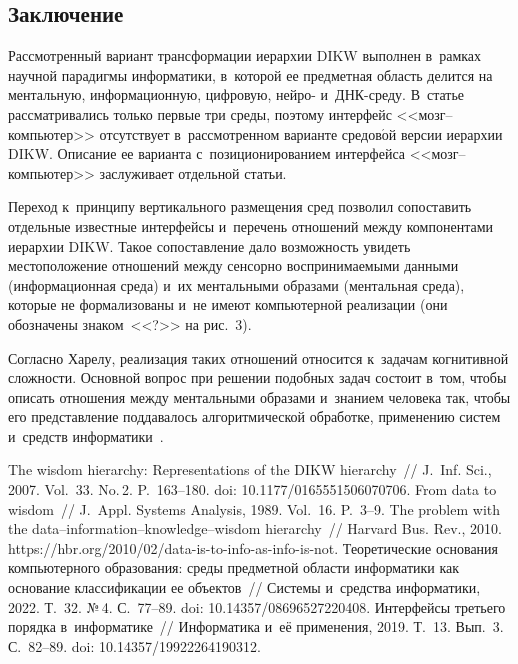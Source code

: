 \begin{multicols}{2}
{}

\vspace*{-6pt}
  
\section{Заключение}

\vspace*{-3pt}

  Рассмотренный вариант трансформации иерархии \mbox{DIKW} выполнен в~рамках 
научной па\-ра\-диг\-мы информатики, в~которой ее предметная об\-ласть делится на 
ментальную, информационную, циф\-ро\-вую, нейро- и~ДНК-сре\-ду. 
В~\mbox{статье} рас\-смат\-ри\-ва\-лись толь\-ко первые три среды, поэтому 
интерфейс <<мозг--ком\-пью\-тер>> отсутствует в~рас\-смот\-рен\-ном варианте 
сре\-до\-в$\acute{\mbox{о}}$й версии иерархии \mbox{DIKW}. Описание ее варианта 
с~позиционированием интерфейса <<мозг--ком\-пью\-тер>> заслуживает 
отдельной \mbox{статьи}.
  
  Переход к~принципу вертикального размещения сред поз\-во\-лил со\-по\-ставить 
отдельные известные интерфейсы и~перечень отношений между компонентами 
иерархии \mbox{DIKW}. Такое со\-по\-став\-ле\-ние дало воз\-мож\-ность увидеть 
мес\-то\-по\-ло\-же\-ние отношений между сенсорно вос\-при\-ни\-ма\-емы\-ми данными 
(информационная среда) и~их ментальными образами (ментальная среда), 
которые не формализованы и~не имеют компьютерной реализации (они 
обозначены знаком~<<?>> на рис.~3).
  
  Согласно Харелу, реализация таких отношений относится к~задачам 
когнитивной слож\-ности. Основной вопрос при решении по\-доб\-ных задач 
со\-сто\-ит в~том, чтобы описать отношения меж\-ду ментальными образами 
и~знанием человека так, чтобы его пред\-став\-ле\-ние под\-да\-ва\-лось 
алгоритмической обработке, применению сис\-тем и~средств 
информатики~\cite[с.~402]{16-zatsm}.

\vspace*{-3pt}
  
{\small\frenchspacing
 { %
 \begin{thebibliography}{99}
 The wisdom hierarchy: Representations of the DIKW hierarchy~// J.~Inf. Sci., 2007. Vol.~33. 
No.\,2. P.~163--180. doi: 10.1177/0165551506070706.
 From data to wisdom~// J.~Appl. Systems Analysis, 1989. Vol.~16. P.~3--9.
 The problem with the data--information--knowledge--wisdom hierarchy~// 
Harvard Bus. Rev., 2010. {\sf https://hbr.org/2010/02/data-is-to-info-as-info-is-not}.
 Тео\-ре\-ти\-че\-ские осно\-ва\-ния компьютерного образования: среды 
пред\-мет\-ной об\-ласти информатики как основание классификации ее объектов~// Сис\-те\-мы 
и~средства информатики, 2022. Т.~32. №\,4. С.~77--89. doi: 10.14357/08696527220408.
 Интерфейсы треть\-его порядка в~информатике~// Информатика и~её 
применения, 2019. Т.~13. Вып.~3. С.~82--89. doi: 10.14357/19922264190312.


\end{thebibliography}}}
\end{multicols}
